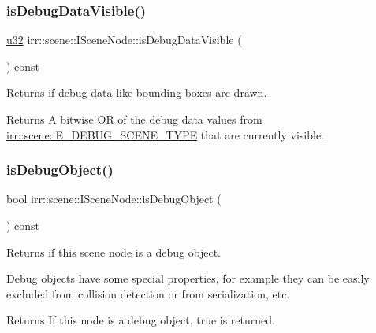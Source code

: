 \subsubsection{\texorpdfstring{is\+Debug\+Data\+Visible()}{isDebugDataVisible()}\hspace{0.1cm}{\footnotesize\ttfamily [2/2]}}
{\footnotesize\ttfamily \hyperlink{namespaceirr_a0416a53257075833e7002efd0a18e804}{u32} irr\+::scene\+::\+I\+Scene\+Node\+::is\+Debug\+Data\+Visible (\begin{DoxyParamCaption}{ }\end{DoxyParamCaption}) const\hspace{0.3cm}{\ttfamily [inline]}}



Returns if debug data like bounding boxes are drawn. 

\begin{DoxyReturn}{Returns}
A bitwise OR of the debug data values from \hyperlink{namespaceirr_1_1scene_a52b664c4c988113735042b168fc32dbe}{irr\+::scene\+::\+E\+\_\+\+D\+E\+B\+U\+G\+\_\+\+S\+C\+E\+N\+E\+\_\+\+T\+Y\+PE} that are currently visible. 
\end{DoxyReturn}
\mbox{\label{classirr_1_1scene_1_1ISceneNode_a304529a50ee58361a84d1db012bbc476}} 
\subsubsection{\texorpdfstring{is\+Debug\+Object()}{isDebugObject()}\hspace{0.1cm}{\footnotesize\ttfamily [1/2]}}
{\footnotesize\ttfamily bool irr\+::scene\+::\+I\+Scene\+Node\+::is\+Debug\+Object (\begin{DoxyParamCaption}{ }\end{DoxyParamCaption}) const\hspace{0.3cm}{\ttfamily [inline]}}



Returns if this scene node is a debug object. 

Debug objects have some special properties, for example they can be easily excluded from collision detection or from serialization, etc. \begin{DoxyReturn}{Returns}
If this node is a debug object, true is returned. 
\end{DoxyReturn}
\mbox{\label{classirr_1_1scene_1_1ISceneNode_a304529a50ee58361a84d1db012bbc476}} 
